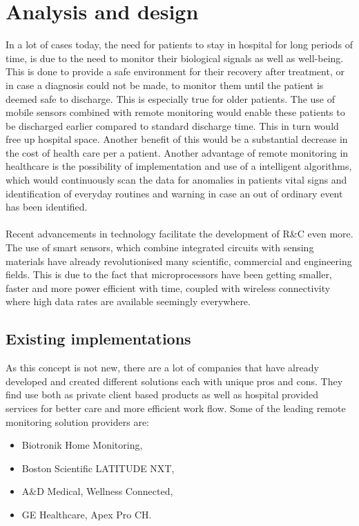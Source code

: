 \documentclass[12pt,]{article}
\numberwithin{figure}{section}
\begin{document}
\section{Analysis and design}
In a lot of cases today, the need for patients to stay in hospital for long periods of time, is due to the need to monitor their biological signals as well as well-being. This is done to provide a safe environment for their recovery after treatment, or in case a diagnosis could not be made, to monitor them until the patient is deemed safe to discharge. This is especially true for older patients. The use of mobile sensors combined with remote monitoring would enable these patients to be discharged earlier compared to standard discharge time. This in turn would free up hospital space. Another benefit of this would be a substantial decrease in the cost of health care per a patient.
Another advantage of remote monitoring in healthcare is the possibility of implementation and use of a intelligent algorithms, which would continuously scan the data for anomalies in patients vital signs and identification of everyday routines and warning in case an out of ordinary event has been identified.\\
\\
Recent advancements in technology facilitate the development of R\&C even more. The use of smart sensors, which combine integrated circuits with sensing materials have already revolutionised many scientific, commercial and engineering fields. This is due to the fact that microprocessors have been getting smaller, faster and more power efficient with time, coupled with wireless connectivity where high data rates are available seemingly everywhere.
\subsection{Existing implementations}
As this concept is not new, there are a lot of companies that have already developed and created different solutions each with unique pros and cons. They find use both as private client based products as well as hospital provided services for better care and more efficient work flow. Some of the leading remote monitoring solution providers are:
\begin{itemize}
\item Biotronik Home Monitoring,
\item Boston Scientific LATITUDE NXT,
\item A\&D Medical, Wellness Connected,
\item GE Healthcare, Apex Pro CH.
\end{itemize}
\end{document}
